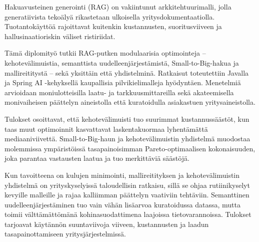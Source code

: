
\newpage
\date{13.11.2026}
\begin{abstractpage}[finnish]
Hakuavusteinen generointi (RAG) on vakiintunut arkkitehtuurimalli, jolla generatiivista tekoälyä rikastetaan ulkoisella yritysdokumentaatiolla. Tuotantokäyttöä rajoittavat kuitenkin kustannusten, suoritusviiveen ja hallusinaatioriskin väliset ristiriidat.

Tämä diplomityö tutkii RAG-putken modulaarisia optimointeja -- kehotevälimuistia, semanttista uudelleenjärjestämistä, Small-to-Big-hakua ja mallireititystä -- sekä yksittäin että yhdistelminä. Ratkaisut toteutettiin Javalla ja Spring AI -kehyksellä kaupallisia pilvikielimalleja hyödyntäen. Menetelmiä arvioidaan moniulotteisilla laatu- ja tarkkuusmittareilla sekä akateemisella monivaiheisen päättelyn aineistolla että kuratoidulla asiakastuen yritysaineistolla.

Tulokset osoittavat, että kehotevälimuisti tuo suurimmat kustannussäästöt, kun taas muut optimoinnit kasvattavat laskentakuormaa lyhentämättä mediaaniviivettä. Small-to-Big-haun ja kehotevälimuistin yhdistelmä muodostaa molemmissa ympäristöissä tasapainoisimman Pareto-optimaalisen kokonaisuuden, joka parantaa vastausten laatua ja tuo merkittäviä säästöjä.

Kun tavoitteena on kulujen minimointi, mallireitityksen ja kehotevälimuistin yhdistelmä on yrityskyselyissä taloudellisin ratkaisu, sillä se ohjaa rutiinikyselyt kevyille malleille ja rajaa kalliimman päättelyn vaativiin tehtäviin. Semanttinen uudelleenjärjestäminen tuo vain vähän lisäarvoa kuratoidussa datassa, mutta toimii välttämättömänä kohinasuodattimena laajoissa tietovarannoissa. Tulokset tarjoavat käytännön suuntaviivoja viiveen, kustannusten ja laadun tasapainottamiseen yritysjärjestelmissä.
\end{abstractpage}
